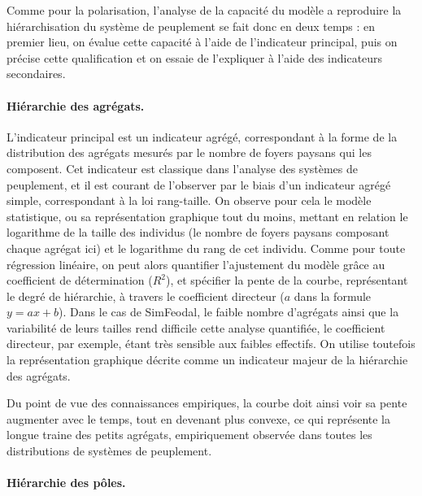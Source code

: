 Comme pour la polarisation, l'analyse de la capacité du modèle a reproduire la hiérarchisation du système de peuplement se fait donc en deux temps :
en premier lieu, on évalue cette capacité à l'aide de l'indicateur principal, puis on précise cette qualification et on essaie de l'expliquer à l'aide des indicateurs secondaires.

\paragraph{Hiérarchie des agrégats.}

L'indicateur principal est un indicateur agrégé, correspondant à la forme de la distribution des agrégats mesurés par le nombre de foyers paysans qui les composent.
Cet indicateur est classique dans l'analyse des systèmes de peuplement, et il est courant de l'observer par le biais d'un indicateur agrégé simple, correspondant à la loi rang-taille.
On observe pour cela le modèle statistique, ou sa représentation graphique tout du moins, mettant en relation le logarithme de la taille des individus (le nombre de foyers paysans composant chaque agrégat ici) et le logarithme du rang de cet individu.
Comme pour toute régression linéaire, on peut alors quantifier l'ajustement du modèle grâce au coefficient de détermination ($R^2$), et spécifier la pente de la courbe, représentant le degré de hiérarchie, à travers le coefficient directeur ($a$ dans la formule $y = ax + b$).
Dans le cas de SimFeodal, le faible nombre d'agrégats ainsi que la variabilité de leurs tailles rend difficile cette analyse quantifiée, le coefficient directeur, par exemple, étant très sensible aux faibles effectifs.
On utilise toutefois la représentation graphique décrite comme un indicateur majeur de la hiérarchie des agrégats.

Du point de vue des connaissances empiriques, la courbe doit ainsi voir sa pente augmenter avec le temps, tout en devenant plus convexe, ce qui représente la \og longue traine\fg{} des petits agrégats, empiriquement observée dans toutes les distributions de systèmes de peuplement.

\paragraph{Hiérarchie des pôles.}

